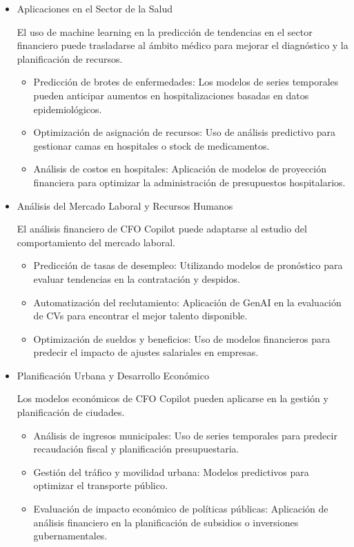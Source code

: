 \documentclass[12pt,letterpaper,oneside]{report}
\renewcommand{\_}{\UnderscoreOriginal\allowbreak}
\begin{document}
\begin{itemize}
\item Aplicaciones en el Sector de la Salud \parencite{Hu2024,Vollmer2021}

El uso de machine learning en la predicción de tendencias en el sector financiero puede trasladarse al ámbito médico para mejorar el diagnóstico y la planificación de recursos.
\begin{itemize}
\item Predicción de brotes de enfermedades: Los modelos de series temporales pueden anticipar aumentos en hospitalizaciones basadas en datos epidemiológicos.
\item Optimización de asignación de recursos: Uso de análisis predictivo para gestionar camas en hospitales o stock de medicamentos.
\item Análisis de costos en hospitales: Aplicación de modelos de proyección financiera para optimizar la administración de presupuestos hospitalarios.
\end{itemize}

\item Análisis del Mercado Laboral y Recursos Humanos \parencite{Gan2024,Nelson2024}

El análisis financiero de CFO Copilot puede adaptarse al estudio del comportamiento del mercado laboral.
\begin{itemize}
\item Predicción de tasas de desempleo: Utilizando modelos de pronóstico para evaluar tendencias en la contratación y despidos.
\item Automatización del reclutamiento: Aplicación de GenAI en la evaluación de CVs para encontrar el mejor talento disponible.
\item Optimización de sueldos y beneficios: Uso de modelos financieros para predecir el impacto de ajustes salariales en empresas.
\end{itemize}

\item Planificación Urbana y Desarrollo Económico \parencite{Anapolsky2023,Novoa2021}

Los modelos económicos de CFO Copilot pueden aplicarse en la gestión y planificación de ciudades.
\begin{itemize}
\item Análisis de ingresos municipales: Uso de series temporales para predecir recaudación fiscal y planificación presupuestaria.
\item Gestión del tráfico y movilidad urbana: Modelos predictivos para optimizar el transporte público.
\item Evaluación de impacto económico de políticas públicas: Aplicación de análisis financiero en la planificación de subsidios o inversiones gubernamentales.
\end{itemize}


\end{itemize}
\end{document}
